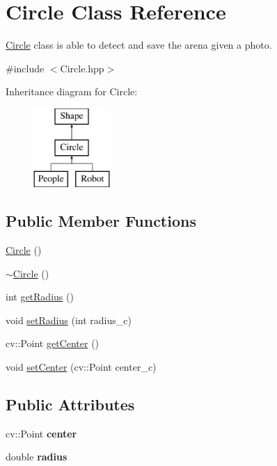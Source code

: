 \hypertarget{class_circle}{}\section{Circle Class Reference}
\label{class_circle}


\mbox{\hyperlink{class_circle}{Circle}} class is able to detect and save the arena given a photo.  




{\ttfamily \#include $<$Circle.\+hpp$>$}

Inheritance diagram for Circle\+:\begin{figure}[H]
\begin{center}
\leavevmode
\includegraphics[height=3.000000cm]{class_circle}
\end{center}
\end{figure}
\subsection*{Public Member Functions}
\begin{DoxyCompactItemize}
\item 
\mbox{\hyperlink{class_circle_ad1ecfcfc7bf34529c6a6d6c448bf70fe}{Circle}} ()
\item 
\mbox{\hyperlink{class_circle_ae3f30436e645d73e368e8ee55f8d1650}{$\sim$\+Circle}} ()
\item 
int \mbox{\hyperlink{class_circle_adfc2e5e026f5d80215563cc42260a237}{get\+Radius}} ()
\item 
void \mbox{\hyperlink{class_circle_ae4a8bd93b437b4cf0077483ff84c8626}{set\+Radius}} (int radius\+\_\+c)
\item 
cv\+::\+Point \mbox{\hyperlink{class_circle_a60d1af499a6ad295f9f2955c4409dddd}{get\+Center}} ()
\item 
void \mbox{\hyperlink{class_circle_a242599150a3623ea837fcb599214e33b}{set\+Center}} (cv\+::\+Point center\+\_\+c)
\end{DoxyCompactItemize}
\subsection*{Public Attributes}
\begin{DoxyCompactItemize}
\item 
\mbox{\label{class_circle_ae7e2ec7201690ce54e41c16a1375ff27}} 
cv\+::\+Point {\bfseries center}
\item 
\mbox{\label{class_circle_a5a0212ba705f57d762bd6b202e3d10ed}} 
double {\bfseries radius}
\end{DoxyCompactItemize}


